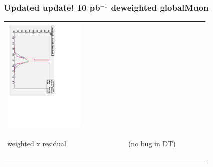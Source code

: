\documentclass[compress]{beamer}
\begin{document}
\begin{frame}
\frametitle{Updated update!  10 pb$^{-1}$ deweighted globalMuon}

\begin{center}
\begin{tabular}{p{0.4\linewidth} c p{0.4\linewidth}}
  \begin{minipage}{\linewidth}
    \includegraphics[height=\linewidth, angle=90]{wxresid_convergence_workingDT.pdf}
  \end{minipage} & &
  \begin{minipage}{\linewidth}
  \end{minipage} \\
  \begin{minipage}{\linewidth}
    \begin{center}
      weighted x residual
    \end{center}
  \end{minipage} & &
  \begin{minipage}{\linewidth}
    \begin{center}
      (no bug in DT)
    \end{center}
  \end{minipage} \\
  & & \\
  \begin{minipage}{\linewidth}

\end{minipage}
\end{tabular}
\end{center}
\end{frame}
\end{document}
